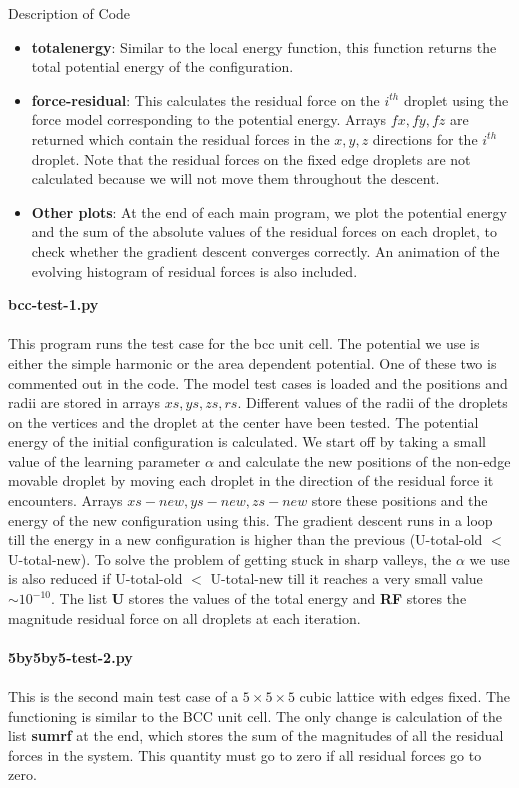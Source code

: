 \documentclass[12pt]{article}
\begin{document}
\begin{section}{Description of Code}
\begin{itemize}
    \item \textbf{totalenergy}: Similar to the local energy function, this function returns the total potential energy of the configuration.
    \item \textbf{force-residual}: This calculates the residual force on the $i^{th}$ droplet using the force model corresponding to the potential energy. Arrays $fx, fy, fz$ are returned which contain the residual forces in the $x,y,z$ directions for the $i^{th}$ droplet. Note that the residual forces on the fixed edge droplets are not calculated because we will not move them throughout the descent. 
    \item \textbf{Other plots}: At the end of each main program, we plot the potential energy and the sum of the absolute values of the residual forces on each droplet, to check whether the gradient descent converges correctly. An animation of the evolving histogram of residual forces is also included.  
\end{itemize}
\textbf{bcc-test-1.py} \\\\ This program runs the test case for the bcc unit cell. The potential we use is either the simple harmonic or the area dependent potential. One of these two is commented out in the code. The model test cases is loaded and the positions and radii are stored in arrays $xs,ys,zs,rs$. Different values of the radii of the droplets on the vertices and the droplet at the center have been tested. The potential energy of the initial configuration is calculated. We start off by taking a small value of the learning parameter $\alpha$ and calculate the new positions of the non-edge movable droplet by moving each droplet in the direction of the residual force it encounters. Arrays $xs-new, ys-new, zs-new$ store these positions and the energy of the new configuration using this. The gradient descent runs in a loop till the energy in a new configuration is higher than the previous (U-total-old $<$ U-total-new). To solve the problem of getting stuck in sharp valleys, the $\alpha$ we use is also reduced if U-total-old $<$ U-total-new till it reaches a very small value $\sim 10^{-10}$. The list \textbf{U} stores the values of the total energy and \textbf{RF} stores the magnitude residual force on all droplets at each iteration. \\\\
\textbf{5by5by5-test-2.py}\\\\
This is the second main test case of a $5 \times 5 \times 5$ cubic lattice with edges fixed. The functioning is similar to the BCC unit cell. The only change is calculation of the list \textbf{sumrf} at the end, which stores the sum of the magnitudes of all the residual forces in the system. This quantity must go to zero if all residual forces go to zero.\\\\

\end{section}
\end{document}
